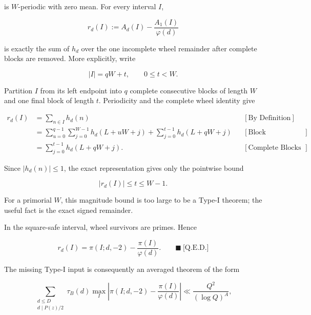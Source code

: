 is $W$-periodic with zero mean. For every interval $I$,

\begin{equation*}
r_d(I)
:=
A_d(I)-\frac{A_1(I)}{\varphi(d)}
\end{equation*}

is exactly the sum of $h_d$ over the one incomplete wheel remainder after
complete blocks are removed. More explicitly, write

\begin{equation*}
|I|=qW+t,
\qquad
0\le t\lt W.
\end{equation*}

Partition $I$ from its left endpoint into $q$ complete consecutive blocks of
length $W$ and one final block of length $t$. Periodicity and the complete
wheel identity give

\begin{equation*}
\begin{aligned}
r_d(I)
&=\sum_{n\in I}h_d(n)
&&[\text{By Definition}]\\
&=\sum_{u=0}^{q-1}\sum_{j=0}^{W-1}h_d(L+uW+j)
  +\sum_{j=0}^{t-1}h_d(L+qW+j)
&&[\text{Block Decomposition}]\\
&=\sum_{j=0}^{t-1}h_d(L+qW+j).
&&[\text{Complete Blocks Have Zero Mean}]
\end{aligned}
\end{equation*}

Since $|h_d(n)|\le1$, the exact representation gives only the pointwise bound

\begin{equation*}
|r_d(I)|\le t\le W-1.
\end{equation*}

For a primorial $W$, this magnitude bound is too large to be a Type-I theorem;
the useful fact is the exact signed remainder.

In the square-safe interval, wheel survivors are primes. Hence

\begin{equation*}
r_d(I)
=
\pi(I;d,-2)-\frac{\pi(I)}{\varphi(d)}.
\qquad\blacksquare\ \text{[Q.E.D.]}
\end{equation*}

The missing Type-I input is consequently an averaged theorem of the form

\begin{equation*}
\sum_{\substack{d\le D\\d\mid P(z)/2}}
\tau_B(d)
\max_I
\left|
\pi(I;d,-2)-\frac{\pi(I)}{\varphi(d)}
\right|
\ll
\frac{Q^2}{(\log Q)^A},
\end{equation*}


